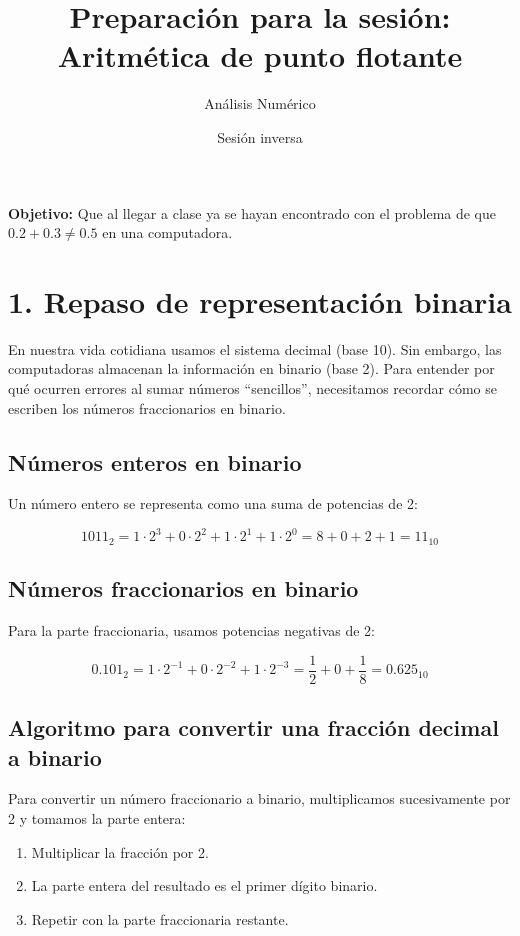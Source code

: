 \documentclass[12pt,letterpaper]{article}
\title{Preparación para la sesión: Aritmética de punto flotante}
\author{Análisis Numérico}
\date{Sesión inversa}
\begin{document}
\maketitle

\begin{center}
\textbf{Objetivo:} Que al llegar a clase ya se hayan encontrado con el problema de que $0.2 + 0.3 \neq 0.5$ en una computadora.
\end{center}

\section*{1. Repaso de representación binaria}

En nuestra vida cotidiana usamos el sistema decimal (base 10). Sin embargo, las computadoras almacenan la información en binario (base 2). Para entender por qué ocurren errores al sumar números ``sencillos'', necesitamos recordar cómo se escriben los números fraccionarios en binario.

\subsection*{Números enteros en binario}
Un número entero se representa como una suma de potencias de 2:

\[
1011_2 = 1\cdot 2^3 + 0\cdot 2^2 + 1\cdot 2^1 + 1\cdot 2^0 = 8 + 0 + 2 + 1 = 11_{10}
\]

\subsection*{Números fraccionarios en binario}
Para la parte fraccionaria, usamos potencias negativas de 2:

\[
0.101_2 = 1\cdot 2^{-1} + 0\cdot 2^{-2} + 1\cdot 2^{-3} = \frac{1}{2} + 0 + \frac{1}{8} = 0.625_{10}
\]

\subsection*{Algoritmo para convertir una fracción decimal a binario}
Para convertir un número fraccionario a binario, multiplicamos sucesivamente por 2 y tomamos la parte entera:

\begin{enumerate}
    \item Multiplicar la fracción por 2.
    \item La parte entera del resultado es el primer dígito binario.
    \item Repetir con la parte fraccionaria restante.
\end{enumerate}
\end{document}
